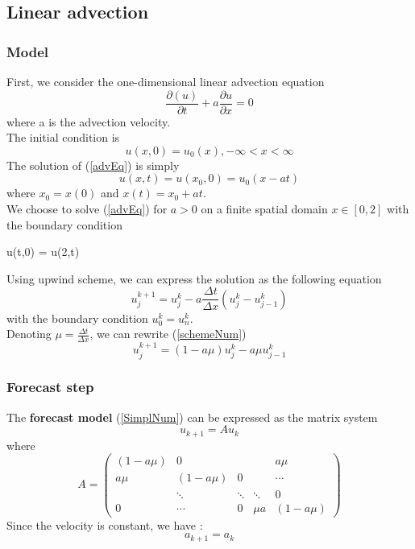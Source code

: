 \documentclass[a4,12pt]{article}
\numberwithin{equation}{section}
\begin{document}
\subsection{Linear advection}
\subsubsection{Model}
First, we consider the one-dimensional linear advection equation
\begin{equation}
\frac{\partial(u)}{\partial t} + a \frac{\partial u}{ \partial x} = 0  
\label{advEq}
\end{equation}
where a is the advection velocity.\\
The initial condition is 
\begin{equation}
u(x,0) = u_0(x)  , -\infty < x < \infty
\end{equation}
The solution of (\ref{advEq}) is simply 
\begin{equation}
u(x,t) = u(x_0,0) = u_0(x-at)
\label{solAdv}
\end{equation}
where $x_0 = x(0)$ and $x(t) = x_0 + at$. \\
We choose to solve (\ref{advEq}) for $a>0$ on a finite spatial domain $x \in [0,2]$ with the boundary condition 
\begin{center}
    u(t,0) = u(2,t) 
\end{center}
Using upwind scheme, we can express the solution as the following equation
\begin{equation}
u_j^{k+1} = u_j^k - a\frac{\Delta t} {\Delta x} ( u_j^k - u_{j-1}^k) 
\label{schemeNum}
\end{equation}
with the boundary condition $u_0^k = u_n^k$. \\
Denoting $\mu = \frac{\Delta t} {\Delta x} $, we can rewrite  (\ref{schemeNum})
\begin{equation}
u_j^{k+1} = (1- a\mu)  u_j^k - a\mu u_{j-1}^k 
\label{SimplNum}
\end{equation}


\subsubsection{Forecast step}
The \textbf{forecast model} (\ref{SimplNum}) can be expressed as the matrix system 
\begin{equation}
u_{k+1} = A  u_k 
\label{forecastAdv}
\end{equation}
where 
\[A = 
\begin{pmatrix}
(1-a\mu)  & 0&   &  &a\mu \\
 a\mu  & (1-a\mu) & 0&  &\cdots \\
 &\ddots & \ddots &\ddots & 0 \\
 0 & \cdots & 0 & \mu a & (1-a\mu)
\end{pmatrix}
\]
Since the velocity is constant, we have :
\begin{equation}
a_{k+1} = a_k 
\label{velocity}
\end{equation}
\end{document}
